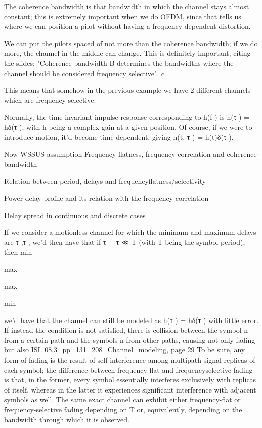 {{{{The coherence bandwidth is that bandwidth in which the channel stays almost constant;
this is extremely important when we do OFDM, since that tells us where we can position a pilot without having a frequency-dependent distortion.

We can put the pilots spaced of not more than the coherence bandwidth; if we do more,
the channel in the middle can change.
This is definitely important; citing the slides: "Coherence bandwidth B determines the bandwidths where the channel should be considered frequency selective".
c

This means that somehow in the previous example we have 2 different channels which are frequency selective:

Normally, the time-invariant impulse response corresponding to h(f ) is h(τ ) = hδ(τ ), with h being a complex gain at a given position. Of course, if we were to introduce motion, it'd become time-dependent, giving h(t, τ ) = h(t)δ(τ ).

Now WSSUS assumption Frequency flatness,
frequency correlation and coherence bandwidth

Relation between period, delays and frequencyflatness/selectivity

Power delay profile and its relation with the frequency correlation

Delay spread in continuous and discrete cases

If we consider a motionless channel for which the minimum and maximum delays are τ
,τ
, we'd then have that if τ
− τ
≪ T (with T being the symbol period), then min

max

max

min

we'd have that the channel can still be modeled as h(τ ) = hδ(τ ) with little error.
If instead the condition is not satisfied, there is collision between the symbol n from a certain path and the symbols \neq n from other paths, causing not only fading but also ISI.
08.3_pp_131_208_Channel_modeling, page 29 To be sure, any form of fading is the result of self-interference among multipath signal replicas of each symbol; the difference between frequency-flat and frequencyselective fading is that, in the former, every symbol essentially interferes exclusively with replicas of itself, whereas in the latter it experiences significant interference with adjacent symbols as well. The same exact channel can exhibit either frequency-flat or frequency-selective fading depending on T or, equivalently,
depending on the bandwidth through which it is observed.

}}}}
